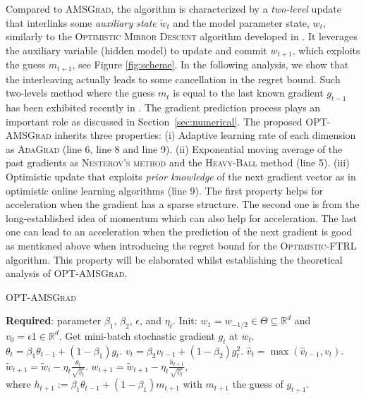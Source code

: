 \documentclass[twoside]{article}
\begin{document}
Compared to \textsc{AMSGrad}, the algorithm is characterized by a \emph{two-level} update that interlinks some \emph{auxiliary state} $\tilde{w}_{t}$ and the model parameter state, $w_t$, similarly to the \textsc{Optimistic Mirror Descent} algorithm developed in \citep{RS13b}.
It leverages the auxiliary variable (hidden model) to update and commit $w_{t+1}$, which exploits the guess $m_{t+1}$, see Figure \ref{fig:scheme}.
In the following analysis, we show that the interleaving actually leads to some cancellation in the regret bound.
Such two-levels method where the guess $m_t$ is equal to the last known gradient $g_{t-1}$ has been exhibited recently in \citep{CJ12}.
The gradient prediction process plays an important role as discussed in Section~\ref{sec:numerical}.
The proposed \textsc{OPT-AMSGrad} inherits three properties: \textsf{(i)} Adaptive learning rate of each dimension as \textsc{AdaGrad} \citep{DHS11} (line 6, line 8 and line 9). \textsf{(ii)} Exponential moving average of the past gradients as \textsc{Nesterov's method} \citep{N04} and the \textsc{Heavy-Ball} method \citep{P64} (line 5). \textsf{(iii)} Optimistic update that exploits \emph{prior knowledge} of the next gradient vector as in optimistic online learning algorithms \citep{CJ12,RS13b,SALS15} (line 9).
The first property helps for acceleration when the gradient has a sparse structure.
The second one is from the long-established idea of momentum which can also help for acceleration. 
The last one can lead to an acceleration when the prediction of the next gradient is good as mentioned above when introducing the regret bound for the \textsc{Optimistic-FTRL} algorithm.
This property will be elaborated whilst establishing the theoretical analysis of \textsc{OPT-AMSGrad}.\vspace{-0.05in}


\begin{algorithm}[H]
\begin{algorithmic}[1] 
\small
\caption{\textsc{OPT-AMSGrad}} \label{alg:optamsgrad}
\STATE \textbf{Required}: parameter $\beta_1$, $\beta_2$, $\epsilon$, and $\eta_t$. 
\STATE Init: $w_1 = w_{-1/2} \in \Theta \subseteq \mathbb R^d $ and $v_{0} = \epsilon 1 \in \mathbb R^{d}$.
\STATE Get mini-batch stochastic gradient $g_t$ at $w_t$.
\STATE $\theta_t = \beta_{1} \theta_{t-1} + (1 - \beta_{1}) g_t$.
\STATE $v_t = \beta_2 v_{t-1} + (1 - \beta_2) g_t^{2}$.
\STATE $\hat{v}_t = \max( \hat{v}_{t-1} , v_t )$. 
\STATE $\tilde{w}_{t+1} =  \tilde{w}_{t} - \eta_t \frac{\theta_t}{ \sqrt{\hat{v}_t }  } $.
\STATE $w_{t+1} = \tilde{w}_{t+1} - \eta_{t} \frac{h_{t+1}}{ \sqrt{\hat{v}_t } } $,  \\  
where $h_{t+1}:= \beta_{1} \theta_{t-1} + (1 - \beta_{1}) m_{t+1}$ with $m_{t+1}$ the guess of $g_{t+1}$. 
\ENDFOR 
\end{algorithmic}
\end{algorithm}
\end{document}
